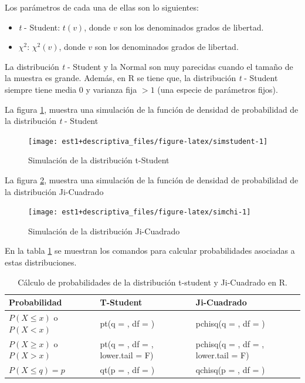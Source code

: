 \documentclass[
  11pt,
]{book}
\providecommand{\tightlist}{%
  \setlength{\itemsep}{0pt}\setlength{\parskip}{0pt}}
\newcommand{\gt}{>}
\newcommand{\lt}{<}
\theoremstyle{definition}
\theoremstyle{definition}
\theoremstyle{definition}
\theoremstyle{definition}
\theoremstyle{remark}
\begin{document}
Los parámetros de cada una de ellas son lo siguientes:

\begin{itemize}
\tightlist
\item
  \emph{t} - Student: \(t(v)\), donde \(v\) son los denominados grados de libertad.
\item
  \(\chi^2\): \(\chi^2(v)\), donde \(v\) son los denominados grados de libertad.
\end{itemize}

La distribución \emph{t} - Student y la Normal son muy parecidas cuando el tamaño de la muestra es grande. Además, en R se tiene que, la distribución \emph{t} - Student siempre tiene media 0 y varianza fija \(> 1\) (una especie de parámetros fijos).

La figura \ref{fig:simstudent}, muestra una simulación de la función de densidad de probabilidad de la distribución \emph{t} - Student

\begin{figure}

{\centering \texttt{[image: est1+descriptiva\_files/figure-latex/simstudent-1]} 

}

\caption{Simulación de la distribución t-Student}\label{fig:simstudent}
\end{figure}

La figura \ref{fig:simchi}, muestra una simulación de la función de densidad de probabilidad de la distribución Ji-Cuadrado

\begin{figure}

{\centering \texttt{[image: est1+descriptiva\_files/figure-latex/simchi-1]} 

}

\caption{Simulación de la distribución Ji-Cuadrado}\label{fig:simchi}
\end{figure}

En la tabla \ref{tab:continuaRtchisq} se muestran los comandos para calcular probabilidades asociadas a estas distribuciones.

\begin{table}[H]
\centering
\caption{\label{tab:continuaRtchisq}Cálculo de probabilidades de la distribución t-student y Ji-Cuadrado en R.}
\centering
\begin{tabular}[t]{>{\raggedright\arraybackslash}p{3cm}>{\raggedright\arraybackslash}p{4cm}>{\raggedright\arraybackslash}p{4cm}}
\toprule
Probabilidad & T-Student & Ji-Cuadrado\\
\midrule
$P(X \leq x)$ o $P(X \lt x)$ & pt(q = , df = ) & pchisq(q = , df = )\\
$P(X \geq x)$ o $P(X \gt x)$ & pt(q = , df = , lower.tail = F) & pchisq(q = , df = , lower.tail = F)\\
$P(X \leq q) = p$ & qt(p = , df = ) & qchisq(p = , df = )\\
\bottomrule
\end{tabular}
\end{table}
\end{document}
